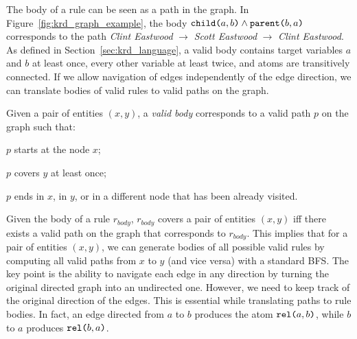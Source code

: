 The body of a rule can be seen as a path in the graph. In Figure~\ref{fig:krd_graph_example}, the body $\texttt{child(}a,b\texttt{)} \wedge \texttt{parent(}b,a\texttt{)}$ corresponds to the path \textit{Clint Eastwood} $\rightarrow$ \textit{Scott Eastwood} $\rightarrow$ \textit{Clint Eastwood}. 
As defined in Section~\ref{sec:krd_language}, a valid body contains target variables $a$ and $b$ at least once, every other variable at least twice, and atoms are transitively connected. 
If we allow navigation of edges independently of the edge direction, we can translate bodies of valid rules to valid paths on the graph.
\begin{inparaenum}[(i)]
	Given a pair of entities $(x,y)$, a {\em valid body} corresponds to a valid path $p$ on the graph such that:
	\item $p$ starts at the node $x$;
	\item $p$ covers $y$ at least once;
	\item $p$ ends in $x$, in $y$, or in a different node that has been already visited.
\end{inparaenum}
%
Given the body of a rule $r_{body}$, $r_{body}$ covers a pair of entities $(x,y)$ iff there exists a valid path on the graph that corresponds to $r_{body}$. This implies that for a pair of entities $(x,y)$, we can generate bodies of all possible valid rules by computing all valid paths from $x$ to $y$ (and vice versa) with a standard BFS. The key point is the ability to navigate each edge in any direction by turning the original directed graph into an undirected one.
However, we need to keep track of the original direction of the edges. This is essential while translating paths to rule bodies. In fact, %
an edge directed from $a$ to $b$ produces the atom $\texttt{rel(}a,b\texttt{)}$, while $b$ to $a$ produces $\texttt{rel(}b,a\texttt{)}$. 

